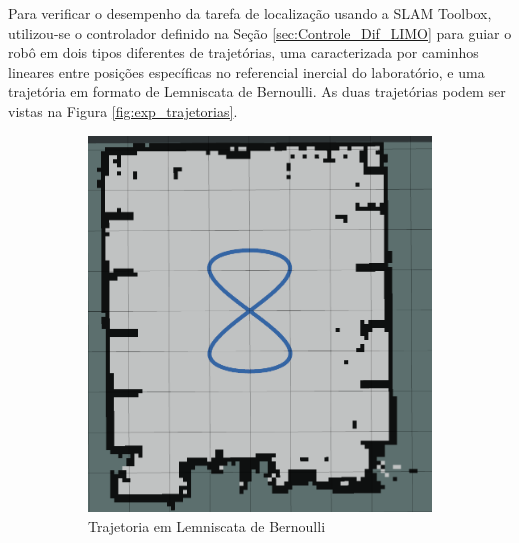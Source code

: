Para verificar o desempenho da tarefa de localização usando a SLAM Toolbox, utilizou-se o controlador definido na Seção \ref{sec:Controle_Dif_LIMO} para guiar o robô em dois tipos diferentes de trajetórias, uma caracterizada por caminhos lineares entre posições específicas no referencial inercial do laboratório, e uma trajetória em formato de Lemniscata de Bernoulli. As duas trajetórias podem ser vistas na Figura \ref{fig:exp_trajetorias}.

\begin{figure}
    \centering
    \caption{Trajetórias Realizadas nos Experimentos}
    \begin{subfigure}[b]{0.4\textwidth}
        \includegraphics[width=\textwidth]{img/Trajetoria_Lemniscata.png}
        \caption{Trajetoria em Lemniscata de Bernoulli}
    \end{subfigure}
    \begin{subfigure}[b]{0.4\textwidth}

\end{subfigure}
\end{figure}

